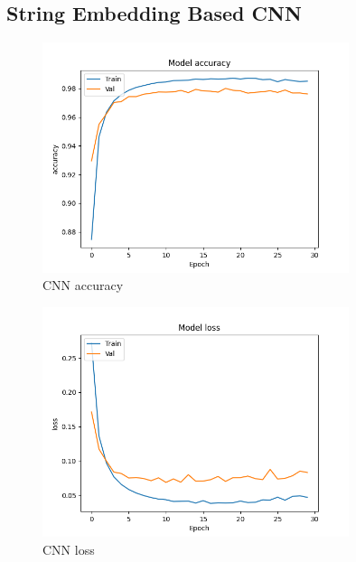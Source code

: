 \documentclass{article}
\begin{document}
    \subsection{String Embedding Based CNN}

    \begin{figure}[H]
        \centering
        \includegraphics[width=0.8\textwidth]{report_img/nn_results/string_embedding_cnn_26/metric_accuracy}
        \caption{CNN accuracy}
        \label{fig:}
    \end{figure}

    \begin{figure}[H]
        \centering
        \includegraphics[width=0.8\textwidth]{report_img/nn_results/string_embedding_cnn_26/metric_loss}
        \caption{CNN loss}
        \label{fig:}
    \end{figure}
\end{document}

